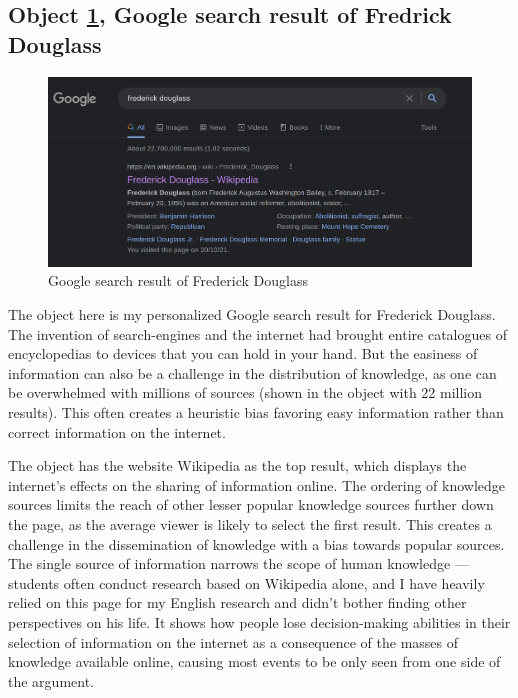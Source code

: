 \documentclass[a4paper,11pt]{article}
\begin{document}


\subsection*{Object \ref{fig:download}, Google search result of Fredrick Douglass}

\begin{figure}[H]
 \centering
 \includegraphics[scale=0.25]{douglass.png}
 \caption{Google search result of Frederick Douglass \parencite{frederick}}
 \label{fig:download}
\end{figure}


The object here is my personalized Google search result for Frederick Douglass. The invention of search-engines and the internet had brought entire catalogues of encyclopedias to devices that you can hold in your hand. But the easiness of information can also be a challenge in the distribution of knowledge, as one can be overwhelmed with millions of sources (shown in the object with 22 million results). This often creates a heuristic bias favoring easy information rather than correct information on the internet.

The object has the website Wikipedia as the top result, which displays the internet's effects on the sharing of information online. The ordering of knowledge sources limits the reach of other lesser popular knowledge sources further down the page, as the average viewer is likely to select the first result. This creates a challenge in the dissemination of knowledge with a bias towards popular sources. The single source of information narrows the scope of human knowledge --- students often conduct research based on Wikipedia alone, and I have heavily relied on this page for my English research and didn't bother finding other perspectives on his life. It shows how people lose decision-making abilities in their selection of information on the internet as a consequence of the masses of knowledge available online, causing most events to be only seen from one side of the argument.
\end{document}

